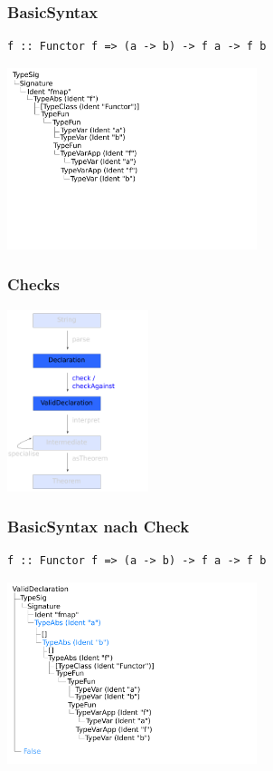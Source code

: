 \documentclass{beamer}
\begin{document}
\begin{frame}[fragile]
\frametitle{BasicSyntax}
\begin{verbatim}
f :: Functor f => (a -> b) -> f a -> f b
\end{verbatim}

\begin{center}
\includegraphics[height=200px]{ast-simple}
\end{center}
\end{frame}


\begin{frame}
\frametitle{Checks}
\begin{center}
\includegraphics[height=200px]{overview-free-theorems-check}
\end{center}
\end{frame}


\begin{frame}[fragile]
\frametitle{BasicSyntax nach Check}
\begin{verbatim}
f :: Functor f => (a -> b) -> f a -> f b
\end{verbatim}

\begin{center}
\includegraphics[height=200px]{ast-simple-checked}
\end{center}
\end{frame}
\end{document}
